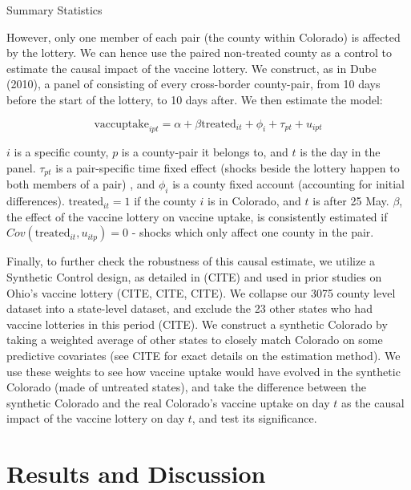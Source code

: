 \documentclass[12pt]{article}
\begin{document}
\begin{spacing}{1.5}
		\begin{table}
			\centering
			\caption{Summary Statistics}
			\centerline{}
			\label{table:didsummary}
		\end{table}
		
		However, only one member of each pair (the county within Colorado) is affected by the lottery. We can hence use the paired non-treated county as a control to estimate the causal impact of the vaccine lottery. We construct, as in Dube (2010), a panel of consisting of every cross-border county-pair, from 10 days before the start of the lottery, to 10 days after. We then estimate the model:
		
		\begin{equation} \label{eq:pairdesign}
			\textrm{vaccuptake}_{ipt} = \alpha + \beta \textrm{treated}_{it} + \phi_i + \tau_{pt} + u_{ipt}
		\end{equation}
		
		$i$ is a specific county, $p$ is a county-pair it belongs to, and $t$ is the day in the panel. $\tau_{pt}$ is a pair-specific time fixed effect (shocks beside the lottery happen to both members of a pair) , and $\phi_i$ is a county fixed account (accounting for initial differences). $\textrm{treated}_{it}=1$ if the county $i$ is in Colorado, and $t$ is after 25 May. $\beta$, the effect of the vaccine lottery on vaccine uptake, is consistently estimated if $Cov(\textrm{treated}_{it}, u_{itp})=0$ - shocks which only affect one county in the pair.
		
		Finally, to further check the robustness of this causal estimate, we utilize a Synthetic Control design, as detailed in (CITE) and used in prior studies on Ohio's vaccine lottery (CITE, CITE, CITE). We collapse our 3075 county level dataset into a state-level dataset, and exclude the 23 other states who had vaccine lotteries in this period (CITE). We construct a synthetic Colorado by taking a weighted average of other states to closely match Colorado on some predictive covariates (see CITE for exact details on the estimation method). We use these weights to see how vaccine uptake would have evolved in the synthetic Colorado (made of untreated states), and take the difference between the synthetic Colorado and the real Colorado's vaccine uptake on day $t$ as the causal impact of the vaccine lottery on day $t$, and test its significance.
		
		\section{Results and Discussion}
		

\end{spacing}
\end{document}
